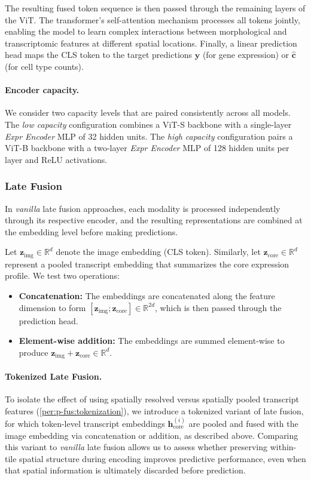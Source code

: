 The resulting fused token sequence is then passed through the remaining layers of the ViT. The transformer's self-attention mechanism processes all tokens jointly, enabling the model to learn complex interactions between morphological and transcriptomic features at different spatial locations. Finally, a linear prediction head maps the CLS token to the target predictions $\hat{\mathbf{y}}$ (for gene expression) or $\hat{\mathbf{c}}$ (for cell type counts).

\paragraph{Encoder capacity.}
We consider two capacity levels that are paired consistently across all models. The \emph{low capacity} configuration combines a ViT-S backbone with a single-layer \emph{Expr Encoder} MLP of 32 hidden units. The \emph{high capacity} configuration pairs a ViT-B backbone with a two-layer \emph{Expr Encoder} MLP of 128 hidden units per layer and ReLU activations.


\subsubsection{Late Fusion}
\label{sec:late-fusion}

In \emph{vanilla} late fusion approaches, each modality is processed independently through its respective encoder, and the resulting representations are combined at the embedding level before making predictions. 

Let $\mathbf{z}_{\text{img}}\in\mathbb{R}^{d}$ denote the image embedding (CLS token). Similarly, let $\mathbf{z}_{\text{core}}\in\mathbb{R}^{d}$ represent a pooled transcript embedding that summarizes the core expression profile. We test two operations:

\begin{itemize}
\item \textbf{Concatenation:} The embeddings are concatenated along the feature dimension to form $[\mathbf{z}_{\text{img}}; \mathbf{z}_{\text{core}}]\in\mathbb{R}^{2d}$, which is then passed through the prediction head.
\item \textbf{Element-wise addition:} The embeddings are summed element-wise to produce $\mathbf{z}_{\text{img}} + \mathbf{z}_{\text{core}}\in\mathbb{R}^{d}$.
\end{itemize}

\paragraph{Tokenized Late Fusion.}\label{per:p-fus:tokenization}
To isolate the effect of using spatially resolved versus spatially pooled transcript features (\autoref{per:p-fus:tokenization}), we introduce a tokenized variant of late fusion, for which token-level transcript embeddings $\mathbf{h}_{\text{core}}^{(i)}$ are pooled and fused with the image embedding via concatenation or addition, as described above. Comparing this variant to \emph{vanilla} late fusion allows us to assess whether preserving within-tile spatial structure during encoding improves predictive performance, even when that spatial information is ultimately discarded before prediction.


